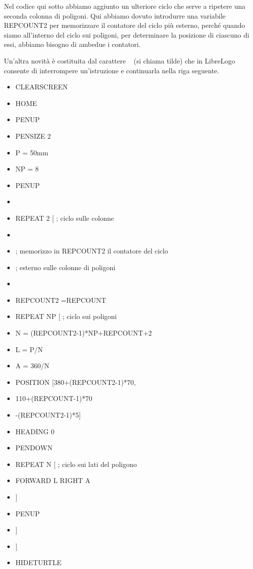 \vskip 1cm


\pagebreak

\begin{scriptsize}
\begin{minipage}{0.50\textwidth}
Nel codice qui sotto abbiamo aggiunto un ulteriore ciclo che serve a ripetere una seconda colonna di poligoni. Qui abbiamo dovuto introdurre una variabile REPCOUNT2 per memorizzare il contatore del ciclo più esterno, perché quando siamo all'interno del ciclo sui poligoni, per determinare la posizione di ciascuno di essi, abbiamo bisogno di ambedue i contatori. 

Un'altra novità è costituita dal carattere ~ (si chiama tilde) che in LibreLogo consente di interrompere un'istruzione e continuarla nella riga seguente.
\begin{itemize}[itemsep=-3pt,parsep=2pt, leftmargin=-0.0mm ]
\item[] CLEARSCREEN                                                    
\item[] HOME
\item[] PENUP
\item[] PENSIZE 2
\item[] P = 50mm
\item[] NP = 8
\item[] PENUP                                                           
\item[] 
\item[] REPEAT 2 [			; ciclo sulle colonne
\item[] 
\item[] ; memorizzo in REPCOUNT2 il contatore del ciclo
\item[] ; esterno sulle colonne di poligoni
\item[]                                                                 
\item[] 	REPCOUNT2 =REPCOUNT
\item[] 	REPEAT NP [		; ciclo sui poligoni
\item[] 		N = (REPCOUNT2-1)*NP+REPCOUNT+2
\item[] 		L = P/N
\item[] 		A = 360/N
\item[] 		POSITION [380+(REPCOUNT2-1)*70, ~
\item[] 			110+(REPCOUNT-1)*70 ~
\item[] 			-(REPCOUNT2-1)*5]
\item[] 		HEADING 0
\item[] 		PENDOWN
\item[] 		REPEAT N [	; ciclo sui lati del poligono
\item[] 			FORWARD L RIGHT A                       
\item[] 		]
\item[] 		PENUP
\item[] 	]
\item[] ]
\item[] HIDETURTLE                                                     
\end{itemize}
\end{minipage}
\end{scriptsize}
